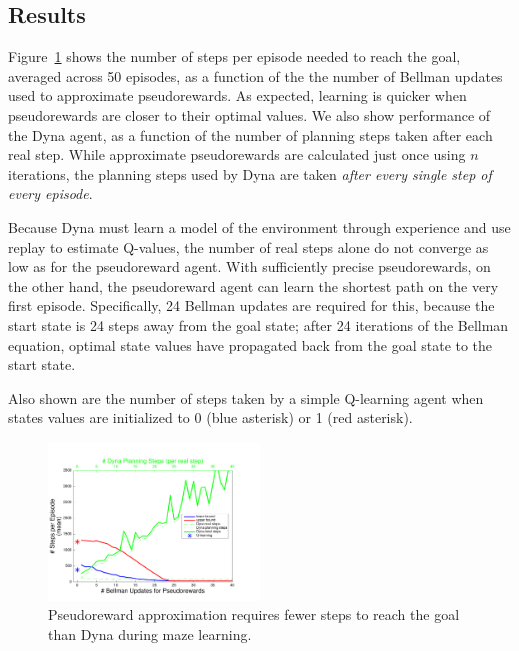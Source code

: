 \documentclass[letterpaper]{article}
\begin{document}
\subsection{Results}

Figure~\ref{fig:maze1} shows the number of steps per episode needed to reach the goal, averaged across 50 episodes, as a function of the the number of Bellman updates used to approximate pseudorewards.
As expected, learning is quicker when pseudorewards are closer to their optimal values. We also show performance of the Dyna agent, as a function of the number of planning steps taken after each real step.
While approximate pseudorewards are calculated just once using $n$ iterations, the planning steps used by Dyna are taken \textit{after every single step of every episode}.

Because Dyna must learn a model of the environment through experience and use replay to estimate Q-values, the number of real steps alone do not converge as low as for the pseudoreward agent. With sufficiently precise pseudorewards, on the other hand, the pseudoreward agent can learn the shortest path on the very first episode. Specifically, 24 Bellman updates are required for this, because the start state is 24 steps away from the goal state; after 24 iterations of the Bellman equation, optimal state values have propagated back from the goal state to the start state.

Also shown are the number of steps taken by a simple Q-learning agent when states values are initialized to 0 (blue asterisk) or 1 (red asterisk).

\begin{figure}[t]
\centering
\includegraphics[width=0.5\textwidth]{learning_vs_PRiterations_DYNA_mean}
\caption{Pseudoreward approximation requires fewer steps to reach the goal than Dyna during maze learning.}
\label{fig:maze1}
\end{figure}
\end{document}
